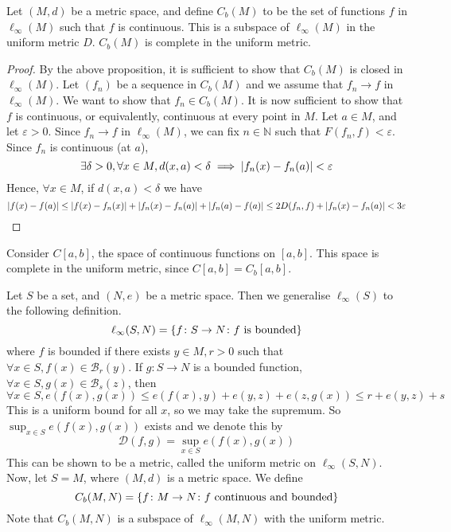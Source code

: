\begin{theorem}
	Let \( (M, d) \) be a metric space, and define \( C_b(M) \) to be the set of functions \( f \) in \( \ell_\infty(M) \) such that \( f \) is continuous.
	This is a subspace of \( \ell_\infty(M) \) in the uniform metric \( D \).
	\( C_b(M) \) is complete in the uniform metric.
\end{theorem}
\begin{proof}
	By the above proposition, it is sufficient to show that \( C_b(M) \) is closed in \( \ell_\infty(M) \).
	Let \( (f_n) \) be a sequence in \( C_b(M) \) and we assume that \( f_n \to f \) in \( \ell_\infty(M) \).
	We want to show that \( f_n \in C_b(M) \).
	It is now sufficient to show that \( f \) is continuous, or equivalently, continuous at every point in \( M \).
	Let \( a \in M \), and let \( \varepsilon > 0 \).
	Since \( f_n \to f \) in \( \ell_\infty(M) \), we can fix \( n \in \mathbb N \) such that \( F(f_n,f) < \varepsilon \).
	Since \( f_n \) is continuous (at \( a \)),
	\[
		\exists \delta > 0, \forall x \in M, d(x,a) < \delta \implies \abs{f_n(x) - f_n(a)} < \varepsilon
	\]
	Hence, \( \forall x \in M \), if \( d(x,a) < \delta \) we have
	\[
		\abs{f(x) - f(a)} \leq \abs{f(x) - f_n(x)} + \abs{f_n(x) - f_n(a)} + \abs{f_n(a) - f(a)} \leq 2 D(f_n,f) + \abs{f_n(x) - f_n(a)} < 3\varepsilon
	\]
\end{proof}
\begin{corollary}
	Consider \( C[a,b] \), the space of continuous functions on \( [a,b] \).
	This space is complete in the uniform metric, since \( C[a,b] = C_b[a,b] \).
\end{corollary}
\begin{definition}
	Let \( S \) be a set, and \( (N,e) \) be a metric space.
	Then we generalise \( \ell_\infty(S) \) to the following definition.
	\[
		\ell_\infty(S,N) = \qty{f \colon S \to N \colon f \text{ is bounded}}
	\]
	where \( f \) is bounded if there exists \( y \in M, r > 0 \) such that \( \forall x \in S, f(x) \in \mathcal B_r(y) \).
	If \( g \colon S \to N \) is a bounded function, \( \forall x \in S, g(x) \in \mathcal B_s(z) \), then
	\[
		\forall x \in S, e(f(x),g(x)) \leq e(f(x),y) + e(y,z) + e(z,g(x)) \leq r + e(y,z) + s
	\]
	This is a uniform bound for all \( x \), so we may take the supremum.
	So \( \sup_{x \in S} e(f(x), g(x)) \) exists and we denote this by
	\[
		\mathcal D(f,g) = \sup_{x \in S} e(f(x), g(x))
	\]
	This can be shown to be a metric, called the uniform metric on \( \ell_\infty(S,N) \).
	Now, let \( S = M \), where \( (M,d) \) is a metric space.
	We define
	\[
		C_b(M, N) = \qty{f \colon M \to N \colon f \text{ continuous and bounded}}
	\]
	Note that \( C_b(M,N) \) is a subspace of \( \ell_\infty(M,N) \) with the uniform metric.
\end{definition}
